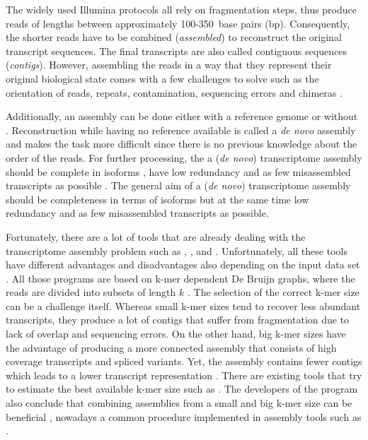 \documentclass[12pt,a4paper,english]{article}
\begin{document}
    The widely used Illumina protocols all rely on fragmentation steps, thus produce reads of lengths between approximately 100-350~base pairs (bp). Consequently, the shorter reads have to be combined (\textit{assembled}) to reconstruct the original transcript sequences. The final transcripts are also called contiguous sequences (\textit{contigs}). However, assembling the reads in a way that they represent their original biological state comes with a few challenges to solve such as the orientation of reads, repeats, contamination, sequencing errors and chimeras \citep{rev_rnaseq_problems:11}.

	Additionally, an assembly can be done either with a reference genome or without \citep{transcriptome_misassemblies:11}. Reconstruction while having no reference available is called a \textit{de novo} assembly and makes the task more difficult since there is no previous knowledge about the order of the reads.
	For further processing, the a (\textit{de novo}) transcriptome assembly should be complete in isoforms \citep{transcriptome_isoforms:18}, have low redundancy \citep{transcriptome_redundancy:15} and as few misassembled transcripts as possible \citep{transcriptome_misassemblies:11}. 
	The general aim of a (\textit{de novo}) transcriptome assembly should be completeness in terms of isoforms but at the same time low redundancy and as few misassembled transcripts as possible.
	
	Fortunately, there are a lot of tools that are already dealing with the transcriptome assembly problem such as \soap \citep{SOAPdenovo-Trans:14}, \trinity \citep{Trinity:11}, \transabyss \citep{Trans-ABySS:10} and \spades \citep{rnaSPAdes:18}. Unfortunately, all these tools have different advantages and disadvantages also depending on the input data set \citep{hoelzer:19}. All those programs are based on k-mer dependent De Bruijn graphs, where the reads are divided into subsets of length $k$ \citep{rev_bruijn:11}. The selection of the correct k-mer size can be a challenge itself. Whereas small k-mer sizes tend to recover less abundant transcripts, they produce a lot of contigs that suffer from fragmentation due to lack of overlap and sequencing errors. On the other hand, big k-mer sizes have the advantage of producing a more connected assembly that consists of high coverage transcripts and spliced variants. Yet, the assembly contains fewer contigs which leads to a lower transcript representation \citep{Rana:16}. There are existing tools that try to estimate the best available k-mer size such as \kmergenie. The developers of the program also conclude that combining assemblies from a small and big k-mer size can be beneficial \citep{kmerGenie:13}, nowadays a common procedure implemented in assembly tools such as \spades \citep{rnaSPAdes:18}.
	
\end{document}
